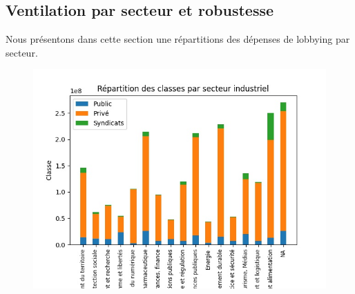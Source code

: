 \documentclass[a4paper,12pt]{article}
\begin{document}
\subsection{Ventilation par secteur et robustesse}

Nous présentons dans cette section une répartitions des dépenses de lobbying par secteur.


\begin{figure}[h!]
\begin{center}
\includegraphics[scale=1]{croise_secteur_classif}
\label{fig}\caption{}\
\end{center}
\end{figure}
 
\end{document}
